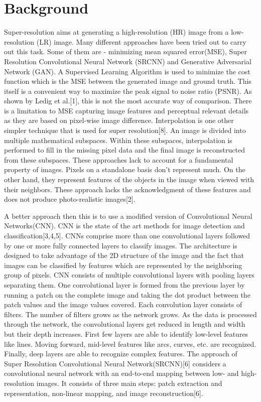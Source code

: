 \section{Background}

Super-resolution aims at generating a high-resolution (HR) image from a low-resolution (LR) image. Many different approaches have been tried out to carry out this task. Some of them are - minimizing mean squared error(MSE), Super Resolution Convolutional Neural Network (SRCNN) and Generative Adversarial Network (GAN). A Supervised Learning Algorithm is used to minimize the cost function which is the MSE between the generated image and ground truth. This itself is a convenient way to maximize the peak signal to noise ratio (PSNR).  As shown by Ledig et al.[1], this is not the most accurate way of comparison. There is a limitation to MSE capturing image features and perceptual relevant details as they are based on pixel-wise image difference. Interpolation is one other simpler technique that is used for super resolution[8]. An image is divided into multiple mathematical subspaces. Within these subspaces, interpolation is performed to fill in the missing pixel data and the final image is reconstructed from these subspaces. These approaches lack to account for a fundamental property of images. Pixels on a standalone basis don’t represent much. On the other hand, they represent features of the objects in the image when viewed with their neighbors. These approach lacks the acknowledgment of these features and does not produce photo-realistic images[2]. 

A better approach then this is to use a modified version of Convolutional Neural Networks(CNN). CNN is the state of the art methods for image detection and classification[3,4,5]. CNNs comprise more than one convolutional layers followed by one or more fully connected layers to classify images. The architecture is designed to take advantage of the 2D structure of the image and the fact that images can be classified by features which are represented by the neighboring group of pixels. CNN consists of multiple convolutional layers with pooling layers separating them. One convolutional layer is formed from the previous layer by running a patch on the complete image and taking the dot product between the patch values and the image values covered. Each convolution layer consists of filters. The number of filters grows as the network grows. As the data is processed through the network, the convolutional layers get reduced in length and width but their depth increases. First few layers are able to identify low-level features like lines. Moving forward, mid-level features like arcs, curves, etc. are recognized. Finally, deep layers are able to recognize complex features. The approach of Super Resolution Convolutional Neural Network(SRCNN)[6] considers a convolutional neural network with an end-to-end mapping between low- and high-resolution images. It consists of three main steps: patch extraction and representation, non-linear mapping, and image reconstruction[6].

